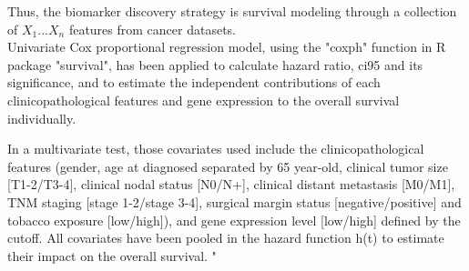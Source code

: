 \documentclass[preprint,12pt]{elsarticle}
\newenvironment{MyIndent}
{\par\leftskip1cm\relax\rightskip1cm\relax}
{\par\leftskip0cm\relax\rightskip0cm\relax}
\newenvironment{MyColorPar}[1]{%
    \leavevmode\color{#1}\ignorespaces%
}{%
}%
\begin{document}
\begin{MyColorPar}{blue}
\begin{MyIndent}
\begin{MyColorPar}{red}
Thus, the biomarker discovery strategy is survival modeling through a collection of $X_1...X_n$ features from cancer datasets.\\[1cm]

Univariate Cox proportional regression model, using the "coxph" function in R package "survival", has been applied to calculate hazard ratio, \acrfull{ci95} and its significance, and to estimate the independent contributions of each clinicopathological features and gene expression to the overall survival individually.


In a multivariate test, those covariates used include the clinicopathological features (gender, age at diagnosed separated by 65 year-old, clinical tumor size [T1-2/T3-4], clinical nodal status [N0/N+], clinical distant metastasis [M0/M1], TNM staging [stage 1-2/stage 3-4], surgical margin status [negative/positive] and tobacco exposure [low/high]), and gene expression level [low/high] defined by the cutoff.
All covariates have been pooled in the hazard function h(t) to estimate their impact on the overall survival.
"
\end{MyColorPar} %
\end{MyIndent}

\end{MyColorPar}%







\end{document}
